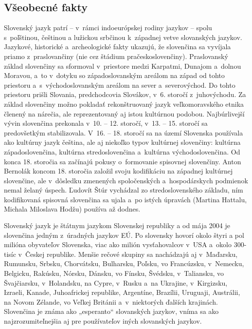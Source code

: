 \clearpage


\begin{multicols}{2}
\subsection{Všeobecné fakty}
Slovenský jazyk patrí – v~rámci indoeurópskej rodiny jazykov –
spolu s~poľštinou, češtinou a lužickou srbčinou k~západnej vetve
slovanských jazykov. Jazykové, historické a~archeologické fakty
ukazujú, že slovenčina sa vyvíjala priamo z~praslovančiny (nie cez
štádium pračeskoslovenčiny). Praslovanský základ slovenčiny sa
sformoval v~priestore medzi Karpatmi, Dunajom a~dolnou Moravou, a~to
v~dotyku so západoslovanským areálom na západ od tohto priestoru
a~s~východoslovanským areálom na sever a~severovýchod. Do tohto
priestoru prišli Slovania, predchodcovia Slovákov, v~6. storočí
z~juhovýchodu. Za základ slovenčiny možno pokladať rekonštruovaný
jazyk veľkomoravského etnika členený na nárečia, ale reprezentovaný aj istou kultúrnou podobou. Najbúrlivejší vývin
slovenčina prekonala v~10. – 12. storočí, v~13. – 15. storočí
sa predovšetkým stabilizovala. V~16. – 18. storočí sa na území
Slovenska používala ako kultúrny jazyk čeština, ale aj niekoľko
typov kultúrnej slovenčiny: kultúrna západoslovenčina, kultúrna
stredoslovenčina a~kultúrna východoslovenčina. Od konca 18.
storočia sa začínajú pokusy o~formovanie spisovnej slovenčiny.
Anton Bernolák koncom 18. storočia založil svoju kodifikáciu na
západnej kultúrnej slovenčine, ale v~dôsledku zmenených
spoločenských a~hospodárskych podmienok nemal želaný úspech.
Ľudovít Štúr vychádzal zo stredoslovenského základu, ním kodifikovaná spisovná slovenčina sa ujala a~po istých úpravách (Martina
Hattalu, Michala Miloslava Hodžu) používa až dodnes.

Slovenský jazyk je štátnym jazykom Slovenskej republiky a od mája 2004 je slovenčina jedným z úradných jazykov EÚ. Po slovensky hovorí okolo štyri a pol milióna obyvateľov Slovenska, viac ako milión vysťahovalcov v~USA a~okolo 300-tisíc v~Českej republike. Menšie rečové skupiny sa nachádzajú aj v~Maďarsku, Rumunsku, Srbsku, Chorvátsku, Bulharsku, Poľsku, vo Francúzsku, v~Nemecku, Belgicku, Rakúsku, Nórsku, Dánsku, vo Fínsku, Švédsku, v~Taliansku, vo Švajčiarsku, v~Holandsku, na Cypre, v~Rusku a~na Ukrajine, v~Kirgizsku, Izraeli, Kanade, Juhoafrickej republike, Argentíne, Brazílii, Uruguaji, Austrálii, na Novom Zélande, vo Veľkej Británii a~v~niektorých ďalších krajinách. Slovenčina je známa ako „esperanto“ slovanských jazykov, vníma sa ako najzrozumiteľnejšia aj pre používateľov iných slovanských jazykov.


\end{multicols}
